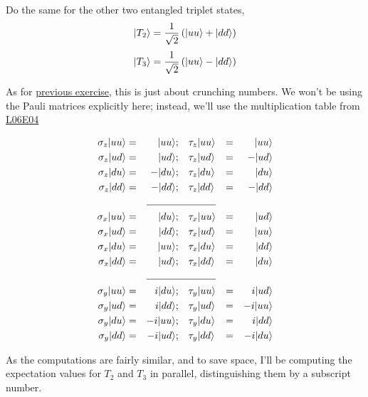 \documentclass[solutions.tex]{subfiles}
\begin{document}
\maketitle
\begin{exercise} Do the same for the other two entangled triplet
states,
\[
	|T_2\rangle = \frac1{\sqrt2}\left(|uu\rangle+|dd\rangle\right)
\]
\[
	|T_3\rangle = \frac1{\sqrt2}\left(|uu\rangle-|dd\rangle\right)
\]
\end{exercise}
As for
\href{https://github.com/mbivert/ttm/blob/master/qm/L06E07.pdf}{previous exercise},
this is just about crunching numbers. We won't be using the Pauli matrices
explicitly here; instead, we'll use the multiplication table from
\href{https://github.com/mbivert/ttm/blob/master/qm/L06E04.pdf}{L06E04}

\begin{equation*}\begin{aligned}
	\sigma_z\ket{uu} &=&\ket{uu};  &&& \tau_z\ket{uu} &=&& \ket{uu} \\
	\sigma_z\ket{ud} &=&\ket{ud};  &&& \tau_z\ket{ud} &=&& -\ket{ud} \\
	\sigma_z\ket{du} &=&-\ket{du}; &&& \tau_z\ket{du} &=&& \ket{du} \\
	\sigma_z\ket{dd} &=&-\ket{dd}; &&& \tau_z\ket{dd} &=&& -\ket{dd} \\
	 \cline{3-6}
	\sigma_x\ket{uu} &=&\ket{du}; &&& \tau_x\ket{uu} &=&& \ket{ud} \\
	\sigma_x\ket{ud} &=&\ket{dd}; &&& \tau_x\ket{ud} &=&& \ket{uu} \\
	\sigma_x\ket{du} &=&\ket{uu}; &&& \tau_x\ket{du} &=&& \ket{dd} \\
	\sigma_x\ket{dd} &=&\ket{ud}; &&& \tau_x\ket{dd} &=&& \ket{du} \\
	 \cline{3-6}
	\sigma_y\ket{uu} &=&i\ket{du};  &&& \tau_y\ket{uu} &=&& i\ket{ud} \\
	\sigma_y\ket{ud} &=&i\ket{dd};  &&& \tau_y\ket{ud} &=&& -i\ket{uu} \\
	\sigma_y\ket{du} &=&-i\ket{uu}; &&& \tau_y\ket{du} &=&& i\ket{dd} \\
	\sigma_y\ket{dd} &=&-i\ket{ud}; &&& \tau_y\ket{dd} &=&& -i\ket{du} \\
\end{aligned}\end{equation*}

\hr

As the computations are fairly similar, and to save space, I'll be computing
the expectation values for $T_2$ and $T_3$ in parallel, distinguishing them by
a subscript number. \\
\end{document}
